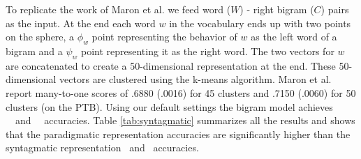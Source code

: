 To replicate the work of Maron et al.  we
feed word ($W$) - right bigram ($C$) pairs as the input.  At the end
each word $w$ in the vocabulary ends up with two points on the sphere,
a $\phi_w$ point representing the behavior of $w$ as the left word of
a bigram and a $\psi_w$ point representing it as the right word.  The
two vectors for $w$ are concatenated to create a 50-dimensional
representation at the end.  These 50-dimensional vectors are clustered
using the k-means algorithm.  Maron et al. 
report many-to-one scores of .6880 (.0016) for 45 clusters and .7150
(.0060) for 50 clusters (on the PTB).  Using our default settings the
bigram model achieves \bgmto\ \mto\ and \bgvm\ \vm\ accuracies.  Table
\ref{tab:syntagmatic} summarizes all the results and shows that the
paradigmatic representation accuracies are significantly higher than
the syntagmatic representation \mto\ and \vm\ accuracies.
